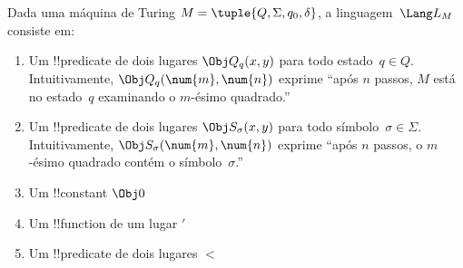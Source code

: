 \documentclass[../../../include/open-logic-section]{subfiles}
\begin{document}
\begin{defn}
Dada uma máquina de Turing $M = \tuple{Q, \Sigma, q_0, \delta}$, a
linguagem~$\Lang L_M$ consiste em:
\begin{enumerate}
\item Um !!{predicate} de dois lugares $\Obj Q_q(x, y)$ para todo
  estado~$q \in Q$.  Intuitivamente, $\Obj Q_q(\num{m}, \num{n})$
  exprime ``após $n$ passos, $M$ está no estado~$q$ examinando o
  $m$-ésimo quadrado.''
\item Um !!{predicate} de dois lugares $\Obj S_\sigma(x, y)$ para todo
  símbolo~$\sigma\in \Sigma$.  Intuitivamente, $\Obj S_\sigma(\num{m},
  \num{n})$ exprime ``após $n$ passos, o $m$-ésimo quadrado contém o
  símbolo~$\sigma$.''
\item Um !!{constant} $\Obj 0$
\item Um !!{function} de um lugar $\prime$
\item Um !!{predicate} de dois lugares $<$
\end{enumerate}
\end{defn}
\end{document}

